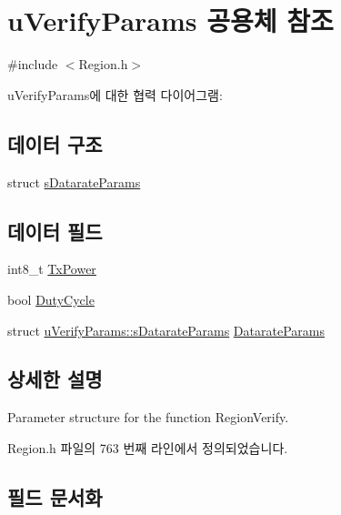 \hypertarget{unionu_verify_params}{}\section{u\+Verify\+Params 공용체 참조}
\label{unionu_verify_params}


{\ttfamily \#include $<$Region.\+h$>$}



u\+Verify\+Params에 대한 협력 다이어그램\+:
\subsection*{데이터 구조}
\begin{DoxyCompactItemize}
\item 
struct \mbox{\hyperlink{structu_verify_params_1_1s_datarate_params}{s\+Datarate\+Params}}
\end{DoxyCompactItemize}
\subsection*{데이터 필드}
\begin{DoxyCompactItemize}
\item 
int8\+\_\+t \mbox{\hyperlink{unionu_verify_params_a037b4f849fa8ed4aa1d3c58aef2b28ec}{Tx\+Power}}
\item 
bool \mbox{\hyperlink{unionu_verify_params_a72f580d8a64ab70f5c4f7e10a694c65b}{Duty\+Cycle}}
\item 
struct \mbox{\hyperlink{structu_verify_params_1_1s_datarate_params}{u\+Verify\+Params\+::s\+Datarate\+Params}} \mbox{\hyperlink{unionu_verify_params_a92427be16343eb3d9c14334eb95ec058}{Datarate\+Params}}
\end{DoxyCompactItemize}


\subsection{상세한 설명}
Parameter structure for the function Region\+Verify. 

Region.\+h 파일의 763 번째 라인에서 정의되었습니다.



\subsection{필드 문서화}
\mbox{\label{unionu_verify_params_a92427be16343eb3d9c14334eb95ec058}} 
